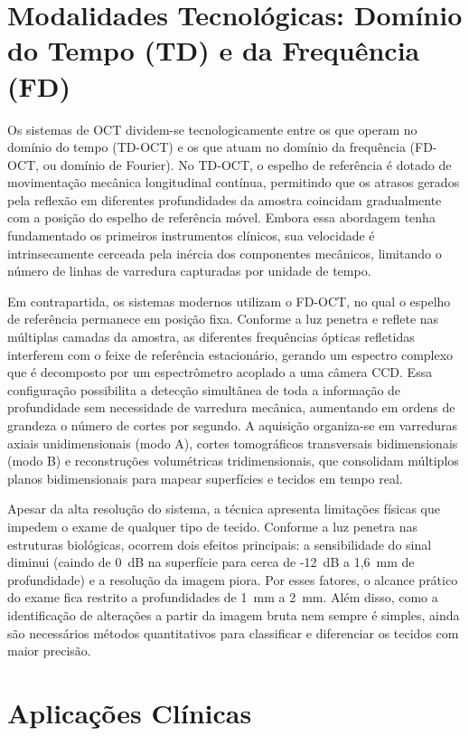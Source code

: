 \documentclass[a4paper,12pt,oneside,openright]{abntex2}
\begin{document}
\section{Modalidades Tecnológicas: Domínio do Tempo (TD) e da Frequência (FD)}

Os sistemas de OCT dividem-se tecnologicamente entre os que operam no domínio do tempo (TD-OCT) e os que atuam no domínio da frequência (FD-OCT, ou domínio de Fourier). No TD-OCT, o espelho de referência é dotado de movimentação mecânica longitudinal contínua, permitindo que os atrasos gerados pela reflexão em diferentes profundidades da amostra coincidam gradualmente com a posição do espelho de referência móvel. Embora essa abordagem tenha fundamentado os primeiros instrumentos clínicos, sua velocidade é intrinsecamente cerceada pela inércia dos componentes mecânicos, limitando o número de linhas de varredura capturadas por unidade de tempo.

Em contrapartida, os sistemas modernos utilizam o FD-OCT, no qual o espelho de referência permanece em posição fixa. Conforme a luz penetra e reflete nas múltiplas camadas da amostra, as diferentes frequências ópticas refletidas interferem com o feixe de referência estacionário, gerando um espectro complexo que é decomposto por um espectrômetro acoplado a uma câmera CCD. Essa configuração possibilita a detecção simultânea de toda a informação de profundidade sem necessidade de varredura mecânica, aumentando em ordens de grandeza o número de cortes por segundo. A aquisição organiza-se em varreduras axiais unidimensionais (modo A), cortes tomográficos transversais bidimensionais (modo B) e reconstruções volumétricas tridimensionais, que consolidam múltiplos planos bidimensionais para mapear superfícies e tecidos em tempo real.

Apesar da alta resolução do sistema, a técnica apresenta limitações físicas que impedem o exame de qualquer tipo de tecido. Conforme a luz penetra nas estruturas biológicas, ocorrem dois efeitos principais: a sensibilidade do sinal diminui (caindo de 0~dB na superfície para cerca de -12~dB a 1,6~mm de profundidade) e a resolução da imagem piora. Por esses fatores, o alcance prático do exame fica restrito a profundidades de 1~mm a 2~mm. Além disso, como a identificação de alterações a partir da imagem bruta nem sempre é simples, ainda são necessários métodos quantitativos para classificar e diferenciar os tecidos com maior precisão.

\section{Aplicações Clínicas}
\end{document}
